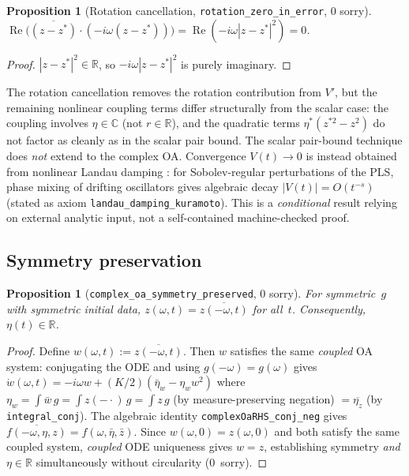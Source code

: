 \documentclass[11pt,a4paper]{article}
\newtheorem{proposition}[theorem]{Proposition}
\theoremstyle{definition}
\DeclareMathOperator{\re}{Re}
\newcommand{\R}{\mathbb{R}}
\newcommand{\C}{\mathbb{C}}
\begin{document}
\begin{proposition}[Rotation cancellation, \texttt{rotation\_zero\_in\_error}, 0 sorry]\label{prop:rotation}
$\re\bigl(\overline{(z-z^*)}\cdot(-i\omega(z-z^*))\bigr) = \re(-i\omega|z-z^*|^2) = 0$.
\end{proposition}
\begin{proof}
$|z-z^*|^2 \in \R$, so $-i\omega|z-z^*|^2$ is purely imaginary.
\end{proof}

The rotation cancellation removes the rotation contribution from $V'$, but the remaining nonlinear coupling terms differ structurally from the scalar case: the coupling involves $\eta \in \C$ (not $r \in \R$), and the quadratic terms $\eta^*(z^{*2} - z^2)$ do not factor as cleanly as in the scalar pair bound. The scalar pair-bound technique does \emph{not} extend to the complex OA. Convergence $V(t) \to 0$ is instead obtained from nonlinear Landau damping \cite{dietert2017}: for Sobolev-regular perturbations of the PLS, phase mixing of drifting oscillators gives algebraic decay $|V(t)| = O(t^{-s})$ (stated as axiom \texttt{landau\_damping\_kuramoto}). This is a \emph{conditional} result relying on external analytic input, not a self-contained machine-checked proof.

\subsection{Symmetry preservation}

\begin{proposition}[\texttt{complex\_oa\_symmetry\_preserved}, 0 sorry]
For symmetric~$g$ with symmetric initial data, $z(\omega,t) = \overline{z(-\omega,t)}$ for all~$t$. Consequently, $\eta(t) \in \R$.
\end{proposition}
\begin{proof}
Define $w(\omega,t) := \overline{z(-\omega,t)}$. Then $w$ satisfies the same \emph{coupled} OA system: conjugating the ODE and using $g(-\omega) = g(\omega)$ gives $\dot w(\omega,t) = -i\omega w + (K/2)(\bar\eta_w - \eta_w w^2)$ where $\eta_w = \int \bar w\,g = \int z(-\cdot)\,g = \int z\,g$ (by measure-preserving negation) $= \overline{\eta_z}$ (by \texttt{integral\_conj}). The algebraic identity \texttt{complexOaRHS\_conj\_neg} gives $\overline{f(-\omega,\eta,z)} = f(\omega,\bar\eta,\bar z)$. Since $w(\omega,0) = z(\omega,0)$ and both satisfy the same coupled system, \emph{coupled} ODE uniqueness gives $w = z$, establishing symmetry \emph{and} $\eta \in \R$ simultaneously without circularity (0~sorry).
\end{proof}
\end{document}
